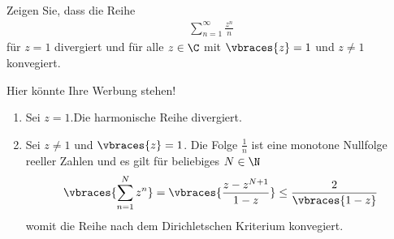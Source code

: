 \begin{exercise}
    Zeigen Sie, dass die Reihe 
    \begin{align*}
        \sum_{n = 1}^\infty \frac{z^n}{n}
    \end{align*}
    für $z = 1$ divergiert und für alle $z \in \C$ mit $\vbraces{z} = 1$ und $z \neq 1$ konvegiert.
\end{exercise}

\begin{solution}
    Hier könnte Ihre Werbung stehen!
    \begin{enumerate}[label = \arabic*.]
        \item Sei $z = 1$.Die harmonische Reihe divergiert.
        \item Sei $z \neq 1$ und $\vbraces{z} = 1$. Die Folge $\frac{1}{n}$ ist eine monotone Nullfolge reeller Zahlen und es gilt für beliebiges $N \in \N$ 
        \begin{align*}
            \vbraces{\sum_{n = 1}^N z^n} = \vbraces{\frac{z - z^{N + 1}}{1 - z}} \leq \frac{2}{\vbraces{1 - z}}
        \end{align*}
        womit die Reihe nach dem Dirichletschen Kriterium konvegiert.
    \end{enumerate}
\end{solution}